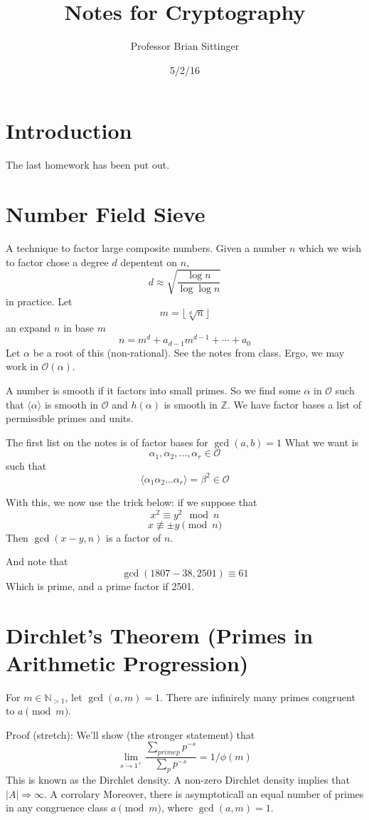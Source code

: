 \documentclass{article}
\title{Notes for Cryptography}
\author{Professor Brian Sittinger}
\date{5/2/16}
\begin{document}
\maketitle
\section{Introduction}
The last homework has been put out. 

\section{Number Field Sieve}
A technique to factor large composite numbers. Given a number $n$ which we wish
to factor chose a degree $d$ depentent on $n$, 
\[ d \approx \sqrt{\frac{\log{n}}{\log{\log{n}}}} \]
in practice. Let 
\[ m = \lfloor \sqrt[d]{n} \rfloor \]
an expand $n$ in base $m$
\[ n = m^{d} + a_{d-1} m^{d-1} + \cdots + a_0 \]
Let $\alpha$ be a root of this (non-rational). See the notes from class. 
Ergo, we may work in $\mathcal{O}(\alpha)$. 

A number is smooth if it factors into small primes. So we find some $\alpha$ in
$\mathcal{O}$ such that $\langle \alpha \rangle$ is smooth in $\mathcal{O}$ and $h(\alpha)$ is
smooth in $\mathbb{Z}$. We have factor bases a list of permissible primes and
units. 

The first list on the notes is of factor bases for $\gcd{(a,b)} = 1$
What we want is 
\[ \alpha_1,\alpha_2, \ldots, \alpha_r \in \mathcal{O} \]
such that
\[ \langle \alpha_1 \alpha_2 \ldots \alpha_r \rangle = \beta^2 \in \mathcal{O} \]

With this, we now use the trick below: if we suppose that
\[ x^2 \equiv y^2 \mod{n}  \]
\[ x \not\equiv \pm y \pmod{n} \]
Then
$\gcd(x-y, n)$ is a factor of $n$. 

And note that
\[ \gcd(1807 - 38, 2501) \equiv 61 \]
Which is prime, and a prime factor if 2501.

\section{Dirchlet's Theorem (Primes in Arithmetic Progression)}
For $m \in \mathbb{N}_{>1}$, let $\gcd(a,m) = 1$. There are infinirely many
primes congruent to $a \pmod{m}$. 

Proof (stretch):
We'll show (the stronger statement) that 
\[ \lim_{s\rightarrow 1^{+}} \frac{\sum_{prime p} p^{-s}}{\sum_{p} p^{-s}} =
1/\phi(m) \]
This is known as the Dirchlet density. A non-zero Dirchlet density implies that
$|A| \Rightarrow \infty$. A corrolary Moreover, there is asymptoticall an equal
number of primes in any congruence class $a \pmod{m}$, where $\gcd(a,m) = 1$. 
\end{document}
